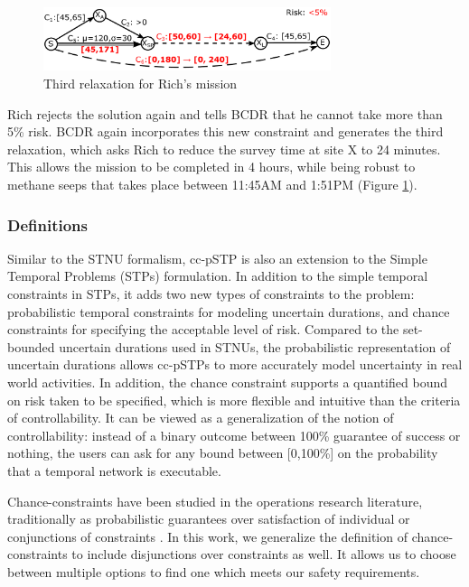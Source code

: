 \documentclass[jair,twoside,11pt,theapa]{article}
\begin{document}
\begin{figure}[htb!]
	\centering
	\includegraphics[width=0.75\textwidth]{figures/ccpstp_example_s3.pdf}
	\caption{Third relaxation for Rich's mission}
	\label{fig:sample_ccpstp_sol3}
\end{figure}



Rich rejects the solution again and tells BCDR that he cannot take more than
5\% risk. BCDR again incorporates this new constraint and generates the third
relaxation, which asks Rich to reduce the survey time
at site X to 24 minutes. This allows the mission to be
completed in 4 hours, while being robust to methane seeps that takes place between 11:45AM and
1:51PM (Figure \ref{fig:sample_ccpstp_sol3}).




\subsubsection{Definitions}

Similar to the STNU formalism, cc-pSTP is also an extension to the Simple
Temporal Problems (STPs) formulation. In addition to the simple temporal
constraints in STPs, it adds two new types of constraints to the problem:
probabilistic temporal constraints for modeling uncertain durations, and chance
constraints for specifying the acceptable level of risk. Compared to the
set-bounded uncertain durations used in STNUs, the
probabilistic representation of uncertain durations allows cc-pSTPs to more
accurately model uncertainty in real world activities. In addition, the chance
constraint supports a quantified bound on risk taken to be specified, which is
more flexible and intuitive than the criteria of controllability. It can be
viewed as a generalization of the notion of controllability: instead of a binary
outcome between 100\% guarantee of success or nothing, the users can ask for any
bound between [0,100\%] on the probability that a temporal network is
executable.

Chance-constraints have been studied in the operations research literature,
traditionally as probabilistic guarantees over satisfaction of  individual or
conjunctions of constraints \cite{kall1976chance}. In this work, we generalize
the definition of chance-constraints to include disjunctions over constraints as
well. It allows us to choose between multiple options to find one which meets
our safety requirements.
\end{document}
